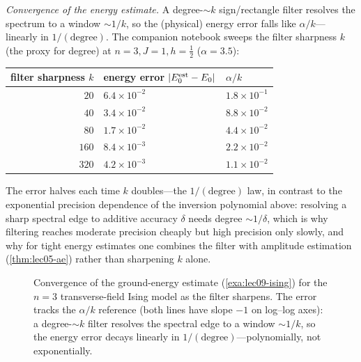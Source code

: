 \begin{example}
\emph{Convergence of the energy estimate.} A degree-$\sim k$ sign/rectangle filter
resolves the spectrum to a window $\sim1/k$, so the (physical) energy error falls like
$\alpha/k$---linearly in $1/(\text{degree})$. The companion notebook sweeps the filter
sharpness $k$ (the proxy for degree) at $n=3,J=1,h=\tfrac12$ ($\alpha=3.5$):
\begin{center}
\begin{tabular}{r l l}
\toprule
filter sharpness $k$ & energy error $\left\lvert E_0^{\mathrm{est}}-E_0 \right\rvert$ & $\alpha/k$\\
\midrule
$20$  & $6.4\times10^{-2}$ & $1.8\times10^{-1}$\\
$40$  & $3.4\times10^{-2}$ & $8.8\times10^{-2}$\\
$80$  & $1.7\times10^{-2}$ & $4.4\times10^{-2}$\\
$160$ & $8.4\times10^{-3}$ & $2.2\times10^{-2}$\\
$320$ & $4.2\times10^{-3}$ & $1.1\times10^{-2}$\\
\bottomrule
\end{tabular}
\end{center}
The error halves each time $k$ doubles---the $1/(\text{degree})$ law, in contrast to the
exponential precision dependence of the inversion polynomial above: resolving a sharp
spectral edge to additive accuracy $\delta$ needs degree $\sim1/\delta$, which is why
filtering reaches moderate precision cheaply but high precision only slowly, and why for
tight energy estimates one combines the filter with amplitude estimation
(\cref{thm:lec05-ae}) rather than sharpening $k$ alone.
\begin{figure}[ht]
\centering
{}
\caption{Convergence of the ground-energy estimate (\cref{exa:lec09-ising}) for the
$n=3$ transverse-field Ising model as the filter sharpens. The error tracks the
$\alpha/k$ reference (both lines have slope $-1$ on log--log axes): a degree-$\sim k$
filter resolves the spectral edge to a window $\sim1/k$, so the energy error decays
linearly in $1/(\text{degree})$---polynomially, not exponentially.}
\label{fig:lec09-ising-conv}
\end{figure}
\end{example}

